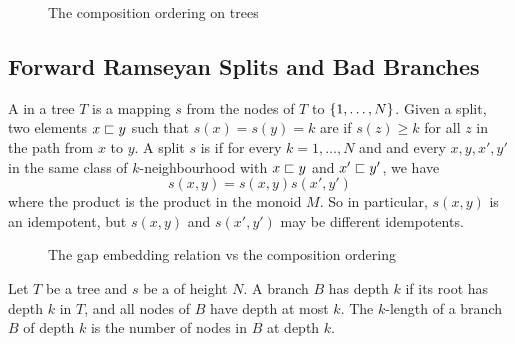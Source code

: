 
\begin{figure}
    \centering
    \caption{The composition ordering on trees}
    \label{composition-ordering:fig}
\end{figure}

\subsection{Forward Ramseyan Splits and Bad Branches}


\AP
A  in a tree $T$ is a mapping $s$ from the nodes
of $T$ to $\{ 1, \dots, N \}$. Given a split, two elements $x \sqsubset y$ such
that $s(x) = s(y) = k$ are  if $s(z) \geq k$ for all
$z$ in the path from $x$ to $y$.
A split $s$ is  if for every $k = 1, \dots, N$ and
and every $x, y, x', y'$ in the same class of $k$-neighbourhood with $x \sqsubset
y$ and $x' \sqsubset y'$, we have
\[
    s(x,y) = s(x,y) s(x',y')
\]
where the product is the product in the monoid $M$.
So in particular, $s(x, y)$ is an idempotent, but $s(x, y)$ and $s(x', y')$ may be
different idempotents.


\begin{figure}
    \centering
    \caption{The gap embedding relation vs the composition ordering}
    \label{gap-embedding-composition-diff:fig}
\end{figure}

\begin{definition}
    \label{ramseyan-branch:def}
    Let $T$ be a tree and $s$ be a  of height $N$.
    A branch $B$ has depth $k$ if its root has depth $k$ in $T$,
    and all nodes of $B$ have depth at most $k$.
    The $k$-length of a branch $B$ of depth $k$ is the number of nodes in $B$
    at depth $k$.
\end{definition}

